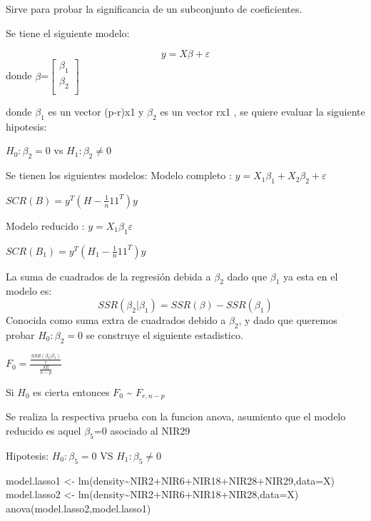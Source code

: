 \documentclass[
]{article}
\newenvironment{Shaded}{\begin{snugshade}}{\end{snugshade}}
\newcommand{\AttributeTok}[1]{\textcolor[rgb]{0.77,0.63,0.00}{#1}}
\newcommand{\FunctionTok}[1]{\textcolor[rgb]{0.00,0.00,0.00}{#1}}
\newcommand{\NormalTok}[1]{#1}
\newcommand{\OtherTok}[1]{\textcolor[rgb]{0.56,0.35,0.01}{#1}}
\newcommand{\SpecialCharTok}[1]{\textcolor[rgb]{0.00,0.00,0.00}{#1}}
\begin{document}
Sirve para probar la significancia de un subconjunto de coeficientes.

Se tiene el siguiente modelo:

\[y = X\beta+\varepsilon\] donde
\(\beta\)=\(\begin{bmatrix} \beta_{1}\\ \beta_{2} \\ \end{bmatrix}\)

donde \(\beta_1\) es un vector (p-r)x1 y \(\beta_2\) es un vector rx1 ,
se quiere evaluar la siguiente hipotesis:

\begin{center}
$H_0 : \beta_2 =0$ vs $H_1: \beta_2 \neq 0 $
\end{center}

Se tienen los siguientes modelos: Modelo completo :
\(y = X_1\beta_1+X_2\beta_2+\varepsilon\)

\(SCR(B)= y^T(H-\frac{1}{n}11^T)y\)

Modelo reducido : \(y = X_1\beta_1\varepsilon\)

\(SCR(B_1)= y^T(H_1-\frac{1}{n}11^T)y\)

La suma de cuadrados de la regresión debida a \(\beta_2\) dado que
\(\beta_1\) ya esta en el modelo es:
\[SSR(\beta_2|\beta_1)=SSR(\beta)-SSR(\beta_1)\] Conocida como suma
extra de cuadrados debido a \(\beta_2\), y dado que queremos probar
\(H_0 : \beta_2 =0\) se construye el siguiente estadistico.

\(F_0 = \frac{\frac{SSR(\beta_2|\beta_1)}{r}}{\frac{SE}{n-p}}\)

Si \(H_0\) es cierta entonces \(F_0\) \textasciitilde{} \(F_{r,n-p}\)

Se realiza la respectiva prueba con la funcion anova, asumiento que el
modelo reducido es aquel \(\beta_5\)=0 asociado al NIR29

Hipotesis: \(H_0:\beta_5=0\) VS \(H_1:\beta_5\neq0\)

\begin{Shaded}
\begin{Highlighting}[]
\NormalTok{model.lasso1 }\OtherTok{\textless{}{-}} \FunctionTok{lm}\NormalTok{(density}\SpecialCharTok{\textasciitilde{}}\NormalTok{NIR2}\SpecialCharTok{+}\NormalTok{NIR6}\SpecialCharTok{+}\NormalTok{NIR18}\SpecialCharTok{+}\NormalTok{NIR28}\SpecialCharTok{+}\NormalTok{NIR29,}\AttributeTok{data=}\NormalTok{X)}
\NormalTok{model.lasso2 }\OtherTok{\textless{}{-}} \FunctionTok{lm}\NormalTok{(density}\SpecialCharTok{\textasciitilde{}}\NormalTok{NIR2}\SpecialCharTok{+}\NormalTok{NIR6}\SpecialCharTok{+}\NormalTok{NIR18}\SpecialCharTok{+}\NormalTok{NIR28,}\AttributeTok{data=}\NormalTok{X)}
\FunctionTok{anova}\NormalTok{(model.lasso2,model.lasso1)}
\end{Highlighting}
\end{Shaded}
\end{document}

